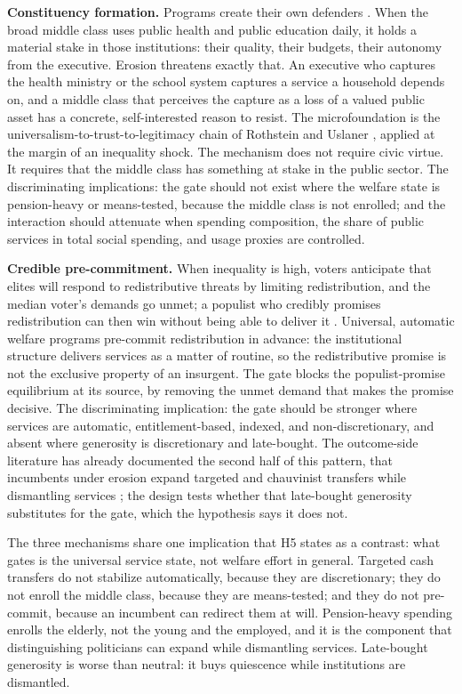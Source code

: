 \textbf{Constituency formation.} Programs create their own defenders \citep{Pierson1993, SossSchram2007}. When the broad middle class uses public health and public education daily, it holds a material stake in those institutions: their quality, their budgets, their autonomy from the executive. Erosion threatens exactly that. An executive who captures the health ministry or the school system captures a service a household depends on, and a middle class that perceives the capture as a loss of a valued public asset has a concrete, self-interested reason to resist. The microfoundation is the universalism-to-trust-to-legitimacy chain of Rothstein and Uslaner \citep{RothsteinUslaner2005}, applied at the margin of an inequality shock. The mechanism does not require civic virtue. It requires that the middle class has something at stake in the public sector. The discriminating implications: the gate should not exist where the welfare state is pension-heavy or means-tested, because the middle class is not enrolled; and the interaction should attenuate when spending composition, the share of public services in total social spending, and usage proxies are controlled.

\textbf{Credible pre-commitment.} When inequality is high, voters anticipate that elites will respond to redistributive threats by limiting redistribution, and the median voter's demands go unmet; a populist who credibly promises redistribution can then win without being able to deliver it \citep{AcemogluEgorov2013}. Universal, automatic welfare programs pre-commit redistribution in advance: the institutional structure delivers services as a matter of routine, so the redistributive promise is not the exclusive property of an insurgent. The gate blocks the populist-promise equilibrium at its source, by removing the unmet demand that makes the promise decisive. The discriminating implication: the gate should be stronger where services are automatic, entitlement-based, indexed, and non-discretionary, and absent where generosity is discretionary and late-bought. The outcome-side literature has already documented the second half of this pattern, that incumbents under erosion expand targeted and chauvinist transfers while dismantling services \citep{SzikraOktem2023, LendvaiBainton2021, Vanhuysse2006, Benczes2024, EnnserJedenastik2018}; the design tests whether that late-bought generosity substitutes for the gate, which the hypothesis says it does not.

The three mechanisms share one implication that H5 states as a contrast: what gates is the universal service state, not welfare effort in general. Targeted cash transfers do not stabilize automatically, because they are discretionary; they do not enroll the middle class, because they are means-tested; and they do not pre-commit, because an incumbent can redirect them at will. Pension-heavy spending enrolls the elderly, not the young and the employed, and it is the component that distinguishing politicians can expand while dismantling services. Late-bought generosity is worse than neutral: it buys quiescence while institutions are dismantled.

